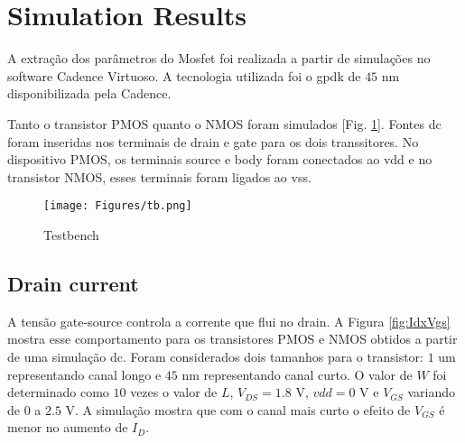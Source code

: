 \documentclass[10pt, conference,a4paper]{IEEEtran}
\begin{document}
\begin{comment}
\subsection{Long-Channel Versus Short-Channel Devices}

Efeitos de canal curto: saturação da velocidade que pode ser gerada porque a corrente de drain tem uma relação linear com vgs, e degradação na mobilidade. 

Outras coisas também que não entendi muito bem em relação a gm saturar com vgs-vth e lei quadrática falha pra descrever inversão fraca. 
Mosfets de canal curto são geralmente muito rápidos, mas não existe modelo simples.
\end{comment}








\section{Simulation Results}
A extração dos parâmetros do Mosfet foi realizada a partir de simulações no software Cadence Virtuoso. A tecnologia utilizada foi o gpdk de $45$ nm disponibilizada pela Cadence. 

Tanto o transistor PMOS quanto o NMOS foram simulados [Fig. \ref{fig:tb}]. Fontes dc foram inseridas nos terminais de drain e gate para os dois transsitores. No dispositivo PMOS, os terminais source e body foram conectados ao vdd e no transistor NMOS, esses terminais foram ligados ao vss.

\begin{figure}[h]
    \centering
    \texttt{[image: Figures/tb.png]}
    \caption{Testbench}
    \label{fig:tb}
\end{figure}

\subsection{Drain current}
A tensão gate-source controla a corrente que flui no drain. A Figura \ref{fig:IdxVgs} mostra esse comportamento para os transistores PMOS e NMOS obtidos a partir de uma simulação dc. Foram considerados dois tamanhos para o transistor: $1$ um representando canal longo e $45$ nm representando canal curto. O valor de $W$ foi determinado como $10$ vezes o valor de $L$, $V_{DS} = 1.8$ V, $vdd = 0$ V e $V_{GS}$ variando de $0$ a $2.5$ V. A simulação mostra que com o canal mais curto o efeito de $V_{GS}$ é menor no aumento de $I_D$. 
\end{document}
